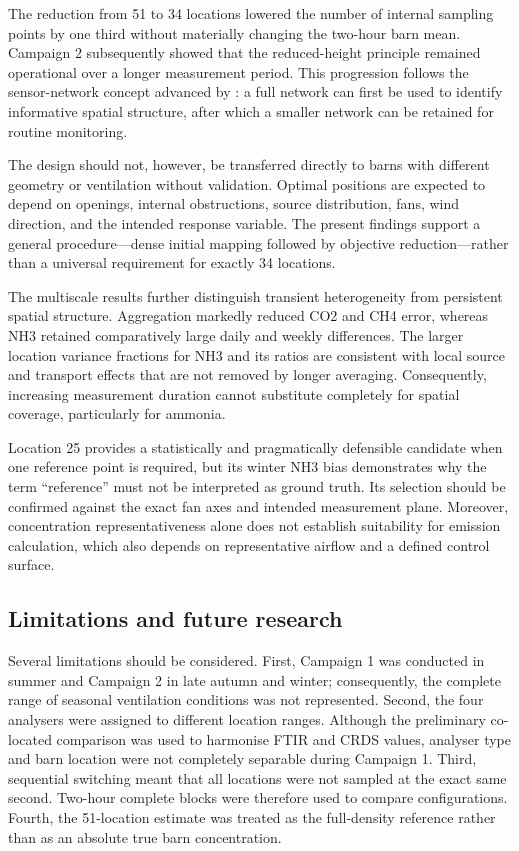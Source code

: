\documentclass[12pt,a4paper]{article}
\begin{document}
The reduction from 51 to 34 locations lowered the number of internal sampling
points by one third without materially changing the two-hour barn mean.
Campaign 2 subsequently showed that the reduced-height principle remained
operational over a longer measurement period. This progression follows the
sensor-network concept advanced by \citet{Chen2026}: a full network can first
be used to identify informative spatial structure, after which a smaller
network can be retained for routine monitoring.

The design should not, however, be transferred directly to barns with
different geometry or ventilation without validation. Optimal positions are
expected to depend on openings, internal obstructions, source distribution,
fans, wind direction, and the intended response variable. The present
findings support a general procedure---dense initial mapping followed by
objective reduction---rather than a universal requirement for exactly 34
locations.

The multiscale results further distinguish transient heterogeneity from
persistent spatial structure. Aggregation markedly reduced CO2 and CH4 error,
whereas NH3 retained comparatively large daily and weekly differences. The
larger location variance fractions for NH3 and its ratios are consistent with
local source and transport effects that are not removed by longer averaging.
Consequently, increasing measurement duration cannot substitute completely
for spatial coverage, particularly for ammonia.

Location 25 provides a statistically and pragmatically defensible candidate
when one reference point is required, but its winter NH3 bias demonstrates why
the term ``reference'' must not be interpreted as ground truth. Its selection
should be confirmed against the exact fan axes and intended measurement plane.
Moreover, concentration representativeness alone does not establish suitability
for emission calculation, which also depends on representative airflow and a
defined control surface.

\subsection{Limitations and future research}

Several limitations should be considered. First, Campaign 1 was conducted in
summer and Campaign 2 in late autumn and winter; consequently, the complete
range of seasonal ventilation conditions was not represented. Second, the
four analysers were assigned to different location ranges. Although the
preliminary co-located comparison was used to harmonise FTIR and CRDS values,
analyser type and barn location were not completely separable during Campaign
1. Third, sequential switching meant that all locations were not sampled at
the exact same second. Two-hour complete blocks were therefore used to compare
configurations. Fourth, the 51-location estimate was treated as the
full-density reference rather than as an absolute true barn concentration.
\end{document}
